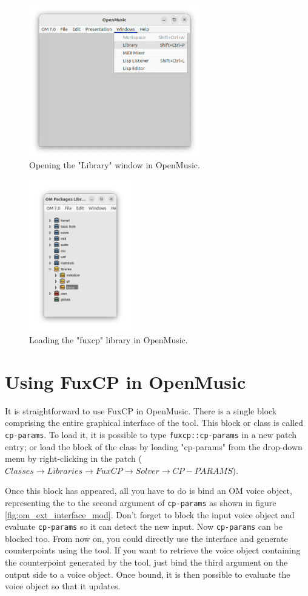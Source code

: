 \begin{figure}[h]
    \centering
    \includegraphics[height=2.6in]{Images/openmusic_library.png}
    \caption{Opening the "Library" window in OpenMusic.}
    \label{fig:library}
\end{figure}
\begin{figure}[h]
    \centering
    \includegraphics[height=2.6in]{Images/openmusic_load.png}
    \caption{Loading the "fuxcp" library in OpenMusic.}
    \label{fig:load}
\end{figure}

\section{Using FuxCP in OpenMusic}
It is straightforward to use FuxCP in OpenMusic. There is a single block comprising the entire graphical interface of the tool. This block or class is called \texttt{cp-params}. To load it, it is possible to type \texttt{fuxcp::cp-params} in a new patch entry; or load the block of the class by loading "cp-params" from the drop-down menu by right-clicking in the patch ($Classes\to Libraries\to FuxCP\to Solver\to CP-PARAMS$).

Once this block has appeared, all you have to do is bind an OM voice object, representing the \cfcomma to the second argument of \texttt{cp-params} as shown in figure \ref{fig:om_ext_interface_mod}. Don't forget to block the input voice object and evaluate \texttt{cp-params} so it can detect the new input. Now \texttt{cp-params} can be blocked too. From now on, you could directly use the interface and generate counterpoints using the tool. If you want to retrieve the voice object containing the counterpoint generated by the tool, just bind the third argument on the output side to a voice object. Once bound, it is then possible to evaluate the voice object so that it updates.

